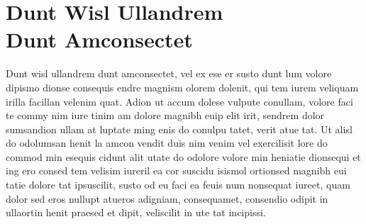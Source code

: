 

\chapter[Dunt Wisl Ullandrem Dunt Amconsectet]{Dunt Wisl Ullandrem\\ Dunt Amconsectet}
Dunt wisl ullandrem dunt amconsectet, vel ex ese er susto dunt lum volore dipismo dionse consequis endre magnism olorem dolenit, qui tem iurem veliquam irilla facillan velenim quat.
Adion ut accum dolese vulpute conullam, volore faci te commy nim iure tinim am dolore magnibh euip elit irit, sendrem dolor sumsandion ullam at luptate ming enis do conulpu tatet, verit atue tat. Ut alisl do odolumsan henit la amcon vendit duis nim venim vel exercilisit lore do commod min esequis cidunt alit utate do odolore volore min heniatie dionsequi et ing ero consed tem velisim iureril ea cor suscidu \cite{Bontempi2005Adaptive} isismol ortionsed magnibh eui tatie dolore tat ipsuscilit, susto od eu faci ea feuis num nonsequat iureet, quam dolor sed eros nullupt atueros adigniam, consequamet, consendio odipit in ullaortin henit praesed et dipit, veliscilit in ute tat incipissi.

